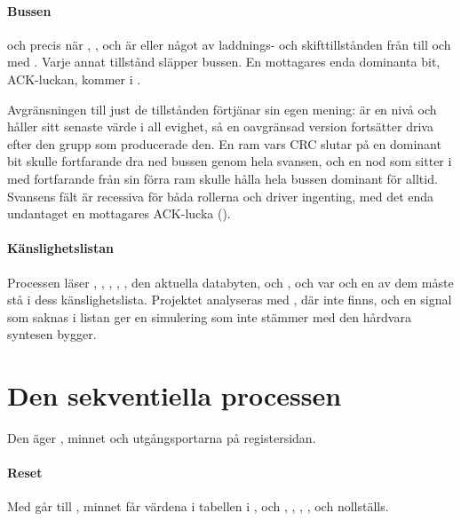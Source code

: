 \paragraph{Bussen}
 och  precis när , ,
och  är  eller något av laddnings- och skifttillstånden från
 till och med . Varje annat tillstånd släpper bussen. En
mottagares enda dominanta bit, ACK-luckan, kommer i .

\begin{warning}
Avgränsningen till just de tillstånden förtjänar sin egen mening:  är en nivå och
håller sitt senaste värde i all evighet, så en oavgränsad version fortsätter driva efter den grupp som
producerade den. En ram vars CRC slutar på en dominant bit skulle fortfarande dra ned bussen genom
hela svansen, och en nod som sitter i  med  fortfarande  från
sin förra ram skulle hålla hela bussen dominant för alltid. Svansens fält är recessiva för båda
rollerna och driver ingenting, med det enda undantaget en mottagares ACK-lucka ().
\end{warning}

\paragraph{Känslighetslistan}
Processen läser , , , , , den
aktuella databyten,  och , och var och en av dem måste stå i dess
känslighetslista. Projektet analyseras med , där  inte finns, och
en signal som saknas i listan ger en simulering som inte stämmer med den hårdvara syntesen bygger.

\section{Den sekventiella processen}
\label{c16:sec:seq}

Den äger , minnet och utgångsportarna på registersidan.

\paragraph{Reset}
Med  går  till , minnet får värdena i tabellen i
, och , , , ,
 och  nollställs.

